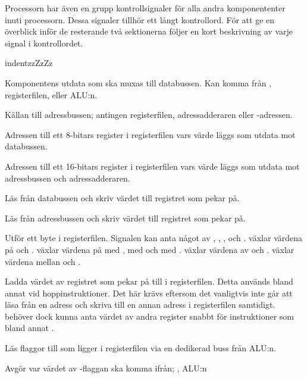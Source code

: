 \documentclass[main.tex]{subfiles}
\begin{document}
Processorn har även en grupp kontrollsignaler för alla andra komponententer
inuti processorn. Dessa signaler tillhör ett långt kontrollord. För att ge en
överblick inför de resterande två sektionerna följer en kort beskrivning av
varje signal i kontrollordet.

\begin{labeling}{indentzzZzZz}
\item[\mono{dbus\_src}]
    Komponentens utdata som ska muxas till databussen. Kan komma från
    , registerfilen,  eller ALU:n.
\item[\mono{abus\_src}]
    Källan till adressbussen; antingen registerfilen, adressadderaren eller
    -adressen.
\item[\mono{rf\_daddr}]
    Adressen till ett 8-bitars register i registerfilen vars värde läggs som
    utdata mot databussen.
\item[\mono{rf\_addr}]
    Adressen till ett 16-bitars register i registerfilen vars värde läggs som
    utdata mot adressbussen och adressadderaren.
\item[\mono{rf\_rdd}]
    Läs från databussen och skriv värdet till registret som 
    pekar på.
\item[\mono{rf\_rda}]
    Läs från adressbussen och skriv värdet till registret som 
    pekar på.
\item[\mono{rf\_swp}]
    Utför ett byte i registerfilen. Signalen kan anta något av ,
    , ,  och .  växlar
    värdena på  och .  växlar värdena på
     med ,  med  och  med
    .  växlar värdena av  och .
     växlar värdena mellan  och .
\item[\mono{rf\_ldpc}]
    Ladda värdet av registret som  pekar på till  i
    registerfilen. Detta används bland annat vid hoppinstruktioner. Det här
    krävs eftersom det vanligtvis inte går att läsa från en adress och skriva
    till en annan adress i registerfilen samtidigt.  behöver dock
    kunna anta värdet av andra register snabbt för instruktioner som bland
    annat .
\item[\mono{f\_rd}]
    Läs flaggor till  som ligger i registerfilen via en dedikerad buss
    från ALU:n.
\item[\mono{pv\_src}]
    Avgör var värdet av -flaggan ska komma ifrån; , ALU:n

\end{labeling}
\end{document}
